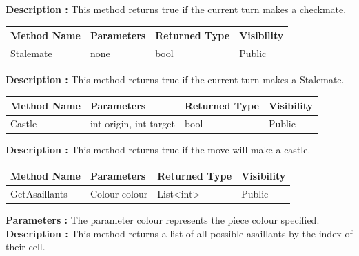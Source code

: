 \documentclass[12pt]{article}
\begin{document}
\textbf{Description :} This method returns true if the current turn makes a checkmate.

\begin{table}[H]
    \begin{tabular}{|l|l|l|l|}
    \hline
    \rowcolor[HTML]{EFEFEF} 
    \cellcolor[HTML]{EFEFEF}\textbf{Method Name} & \textbf{Parameters}     & \textbf{Returned Type} & \textbf{Visibility} \\ \hline
    Stalemate                                    & none                    & bool                   & Public              \\ \hline
    \end{tabular}
\end{table}

\textbf{Description :} This method returns true if the current turn makes a Stalemate.

\begin{table}[H]
    \begin{tabular}{|l|l|l|l|}
    \hline
    \rowcolor[HTML]{EFEFEF} 
    \cellcolor[HTML]{EFEFEF}\textbf{Method Name} & \textbf{Parameters}      & \textbf{Returned Type} & \textbf{Visibility} \\ \hline
    Castle                                       & int origin, int target   & bool                   & Public              \\ \hline
    \end{tabular}
\end{table}

\textbf{Description :} This method returns true if the move will make a castle.

\begin{table}[H]
    \begin{tabular}{|l|l|l|l|}
    \hline
    \rowcolor[HTML]{EFEFEF} 
    \cellcolor[HTML]{EFEFEF}\textbf{Method Name} & \textbf{Parameters}     & \textbf{Returned Type} & \textbf{Visibility} \\ \hline
    GetAsaillants                                & Colour colour           & List<int>                   & Public              \\ \hline
    \end{tabular}
\end{table}

\textbf{Parameters :} The parameter colour represents the piece colour specified.
\textbf{Description :} This method returns a list of all possible asaillants by the index of their cell.
\end{document}
